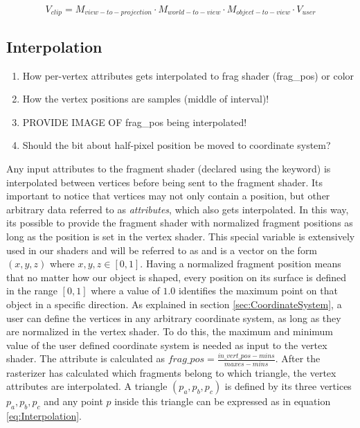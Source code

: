 \begin{equation}\label{eq:ObjectToClipCoordinates}
    V_{clip} = M_{view-to-projection} \cdot M_{world-to-view} \cdot M_{object-to-view} \cdot V_{user}
\end{equation}

\subsection{Interpolation}\label{sec:Interpolation}
\begin{enumerate}
    \item[\done] How per-vertex attributes gets interpolated to frag shader (frag\_pos) or color
    \item[\done] How the vertex positions are samples (middle of interval)!
    \item[\done] PROVIDE IMAGE OF frag\_pos being interpolated!
    \item Should the bit about half-pixel position be moved to coordinate system?
\end{enumerate}

Any input attributes to the fragment shader (declared using the  keyword) is interpolated between vertices before being sent to the fragment shader. Its important to notice that vertices may not only contain a position, but other arbitrary data referred to as \textit{attributes}, which also gets interpolated. In this way, its possible to provide the fragment shader with normalized fragment positions as long as the position is set in the vertex shader. This special variable is extensively used in our shaders and will be referred to as   and is a vector on the form $(x,y,z)$ where $x,y,z \in [0,1]$. Having a normalized fragment position means that no matter how our object is shaped, every position on its surface is defined in the range $[0,1]$ where a value of $1.0$ identifies the maximum point on that object in a specific direction. As explained in section \ref{sec:CoordinateSystem}, a user can define the vertices in any arbitrary coordinate system, as long as they are normalized in the vertex shader. To do this, the maximum and minimum value of the user defined coordinate system is needed as input to the vertex shader. The attribute  is calculated as $frag\_pos = \frac{in\_vert\_pos - mins}{maxes-mins}$. After the rasterizer has calculated which fragments belong to which triangle, the vertex attributes are interpolated. A triangle $(p_a,p_b,p_c)$ is defined by its three vertices $p_a,p_b,p_c$ and any point $p$ inside this triangle can be expressed as in equation \ref{eq:Interpolation}.

